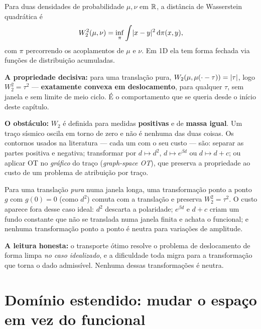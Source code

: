 \documentclass[11pt,a4paper,oneside]{report}
\begin{document}
\begin{teoria}
Para duas densidades de probabilidade $\mu,\nu$ em $\mathbb{R}$, a dist\^ancia de
Wasserstein quadr\'atica \'e
\[
W_2^{2}(\mu,\nu) = \inf_{\pi}\int \lvert x-y \rvert^{2}\,\mathrm{d}\pi(x,y),
\]
com $\pi$ percorrendo os acoplamentos de $\mu$ e $\nu$. Em 1D ela tem forma
fechada via fun\c{c}\~oes de distribui\c{c}\~ao acumuladas.

\textbf{A propriedade decisiva:} para uma transla\c{c}\~ao pura,
$W_2(\mu, \mu(\cdot-\tau)) = \lvert \tau \rvert$, logo $W_2^{2} = \tau^{2}$ ---
\textbf{exatamente convexa em deslocamento}, para qualquer $\tau$, sem janela
e sem limite de meio ciclo. \'E o comportamento que se queria desde o
in\'icio deste cap\'itulo.

\textbf{O obst\'aculo:} $W_2$ \'e definida para medidas \textbf{positivas} e
de \textbf{massa igual}. Um tra\c{c}o s\'ismico oscila em torno de zero e
n\~ao \'e nenhuma das duas coisas. Os contornos usados na literatura --- cada
um com o seu custo --- s\~ao: separar as partes positiva e negativa;
transformar por $d\mapsto d^{2}$, $d \mapsto e^{\beta d}$ ou $d\mapsto d + c$;
ou aplicar OT no \emph{gr\'afico} do
tra\c{c}o (\emph{graph-space OT}), que preserva a propriedade ao custo de um
problema de atribui\c{c}\~ao por tra\c{c}o.

Para uma transla\c{c}\~ao \emph{pura} numa janela longa, uma
transforma\c{c}\~ao ponto a ponto $g$ com $g(0)=0$ (como $d^{2}$) comuta com a
transla\c{c}\~ao e preserva $W_2^{2} = \tau^{2}$. O custo aparece fora desse
caso ideal: $d^{2}$ descarta a polaridade; $e^{\beta d}$ e $d+c$ criam um fundo
constante que n\~ao se translada numa janela finita e achata o funcional; e
nenhuma transforma\c{c}\~ao ponto a ponto \'e neutra para varia\c{c}\~oes de
amplitude.

\textbf{A leitura honesta:} o transporte \'otimo resolve o problema de
deslocamento de forma limpa \emph{no caso idealizado}, e a dificuldade toda
migra para a transforma\c{c}\~ao que torna o dado admiss\'ivel. Nenhuma dessas
transforma\c{c}\~oes \'e neutra.
\end{teoria}

\section{Dom\'inio estendido: mudar o espa\c{c}o em vez do funcional}
\label{sec:wri}
\end{document}
